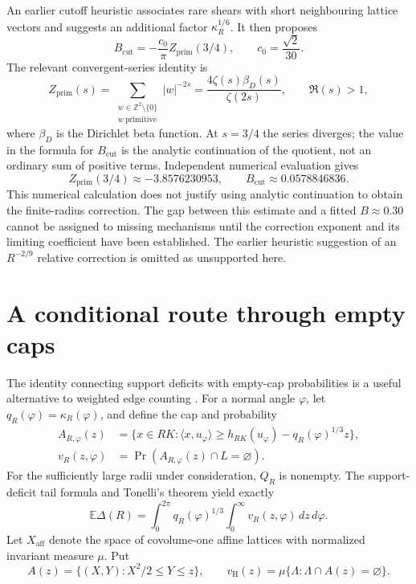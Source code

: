 \documentclass[11pt,a4paper]{article}
\newcommand{\E}{\mathbb E}
\newcommand{\Z}{\mathbb Z}
\begin{document}
An earlier cutoff heuristic associates rare shears with short neighbouring lattice vectors and suggests an additional factor $\kappa_R^{1/6}$. It then proposes
\[
 B_{\mathrm{cut}}=-\frac{c_0}{\pi}Z_{\mathrm{prim}}(3/4),
 \qquad c_0=\frac{\sqrt2}{30}.
\]
The relevant convergent-series identity is
\begin{equation}\label{eq:zeta}
 Z_{\mathrm{prim}}(s)=
 \sum_{\substack{w\in\Z^2\setminus\{0\}\\w\ \mathrm{primitive}}}
 |w|^{-2s}
 =\frac{4\zeta(s)\beta_D(s)}{\zeta(2s)},\qquad \Re(s)>1,
\end{equation}
where $\beta_D$ is the Dirichlet beta function. At $s=3/4$ the series diverges; the value in the formula for $B_{\mathrm{cut}}$ is the analytic continuation of the quotient, not an ordinary sum of positive terms. Independent numerical evaluation gives
\[
 Z_{\mathrm{prim}}(3/4)\approx-3.8576230953,
 \qquad B_{\mathrm{cut}}\approx0.0578846836.
\]
This numerical calculation does not justify using analytic continuation to obtain the finite-radius correction. The gap between this estimate and a fitted $B\approx0.30$ cannot be assigned to missing mechanisms until the correction exponent and its limiting coefficient have been established. The earlier heuristic suggestion of an $R^{-2/9}$ relative correction is omitted as unsupported here.

\section{A conditional route through empty caps}
The identity connecting support deficits with empty-cap probabilities is a useful alternative to weighted edge counting \cite[Lemma 3.1]{NR}. For a normal angle $\varphi$, let $q_R(\varphi)=\kappa_R(\varphi)$, and define the cap and probability
\begin{align*}
 A_{R,\varphi}(z)&=\{x\in RK:\langle x,u_\varphi\rangle
       \geq h_{RK}(u_\varphi)-q_R(\varphi)^{1/3}z\},\\
 v_R(z,\varphi)&=\Pr(A_{R,\varphi}(z)\cap L=\varnothing).
\end{align*}
For the sufficiently large radii under consideration, $Q_R$ is nonempty. The support-deficit tail formula and Tonelli's theorem yield exactly
\[
 \E\Delta(R)=\int_0^{2\pi}q_R(\varphi)^{1/3}
                  \int_0^\infty v_R(z,\varphi)\,dz\,d\varphi.
\]
Let $X_{\mathrm{aff}}$ denote the space of covolume-one affine lattices with normalized invariant measure $\mu$. Put
\[
 A(z)=\{(X,Y):X^2/2\leq Y\leq z\},\qquad
 v_{\mathrm H}(z)=\mu\{\Lambda:\Lambda\cap A(z)=\varnothing\}.
\]
\end{document}
